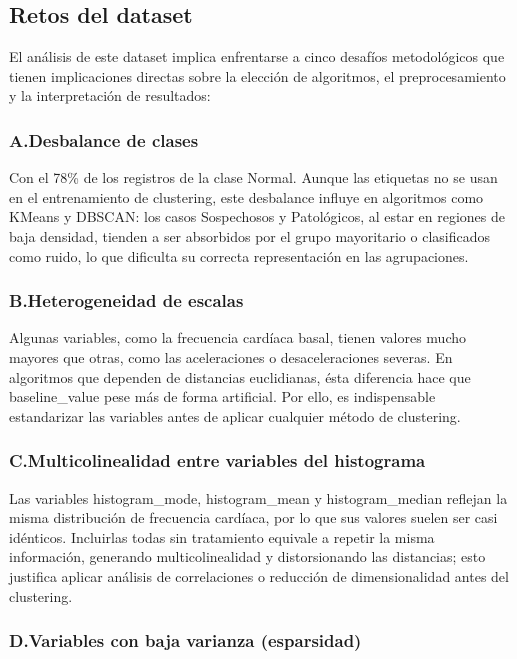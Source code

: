 \documentclass[12pt,letterpaper]{article}
\begin{document}
\subsection{Retos del dataset}

El análisis de este dataset implica enfrentarse a cinco desafíos metodológicos que tienen
implicaciones directas sobre la elección de algoritmos, el preprocesamiento y la interpretación
de resultados:

\subsubsection*{A.\enspace Desbalance de clases}

Con el 78\% de los registros de la clase Normal. Aunque las etiquetas no se usan en el entrenamiento de clustering, este desbalance influye en algoritmos como K\-Means y DBSCAN: los casos Sospechosos y Patológicos, al estar en regiones de baja densidad, tienden a ser absorbidos por el grupo mayoritario o clasificados como ruido, lo que dificulta su correcta representación en las agrupaciones.

\subsubsection*{B.\enspace Heterogeneidad de escalas}

Algunas variables, como la frecuencia cardíaca basal, tienen valores mucho mayores que otras, como las aceleraciones o desaceleraciones severas. En algoritmos que dependen de distancias euclidianas, ésta diferencia hace que baseline\_value pese más de forma artificial. Por ello, es indispensable estandarizar las variables antes de aplicar cualquier método de clustering.

\subsubsection*{C.\enspace Multicolinealidad entre variables del histograma}

Las variables histogram\_mode, histogram\_mean y histogram\_median reflejan la misma distribución de frecuencia cardíaca, por lo que sus valores suelen ser casi idénticos. Incluirlas todas sin tratamiento equivale a repetir la misma información, generando multicolinealidad y distorsionando las distancias; esto justifica aplicar análisis de correlaciones o reducción de dimensionalidad antes del clustering.

\subsubsection*{D.\enspace Variables con baja varianza (esparsidad)}
\end{document}
